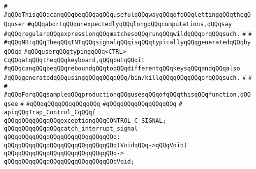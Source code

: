 \verb|#|\newline
\verb|#qQQqThisqQQqcanqQQqbeqQQqaqQQqusefulqQQqwayqQQqofqQQqlettingqQQqtheqQQquser|\newline
\verb|#qQQqabortqQQqunexpectedlyqQQqlongqQQqcomputations,qQQqsay|\newline
\verb|#qQQqregularqQQqexpressionqQQqmatchesqQQqrunqQQqwildqQQqorqQQqsuch.|\newline
\verb|#|\newline
\verb|#|\newline
\verb|#qQQqNB:qQQqTheqQQqINTqQQqsignalqQQqisqQQqtypicallyqQQqgeneratedqQQqbyqQQqa|\newline
\verb|#qQQquserqQQqtypingqQQq<CTRL>-CqQQqatqQQqtheqQQqkeyboard,qQQqbutqQQqit|\newline
\verb|#qQQqcanqQQqbeqQQqreboundqQQqtoqQQqdifferentqQQqkeysqQQqandqQQqalso|\newline
\verb|#qQQqgeneratedqQQqusingqQQqqQQqqQQq/bin/killqQQqqQQqqQQqorqQQqsuch.|\newline
\verb|#|\newline
\verb|#|\newline
\verb|#|\newline
\verb|#qQQqForqQQqsampleqQQqproductionqQQqusesqQQqofqQQqthisqQQqfunction,qQQqsee|\newline
\verb|#|\newline
\verb|#qQQqqQQqqQQqqQQqqQQq|\newline
\verb|#qQQqqQQqqQQqqQQqqQQq|\newline
\verb|#|\newline
\newline
\newline
\verb|apiqQQqTrap_Control_CqQQq{|\newline
\newline
\verb|qQQqqQQqqQQqqQQqexceptionqQQqCONTROL_C_SIGNAL;|\newline
\newline
\verb|qQQqqQQqqQQqqQQqcatch_interrupt_signal|\newline
\verb|qQQqqQQqqQQqqQQqqQQqqQQqqQQqqQQq:|\newline
\verb|qQQqqQQqqQQqqQQqqQQqqQQqqQQqqQQq(VoidqQQq->qQQqVoid)|\newline
\verb|qQQqqQQqqQQqqQQqqQQqqQQqqQQqqQQq->|\newline
\verb|qQQqqQQqqQQqqQQqqQQqqQQqqQQqqQQqVoid;|\newline
